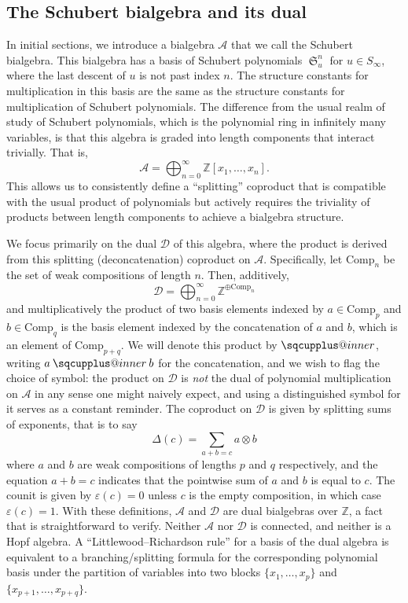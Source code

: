 \documentclass{amsart}
\makeatletter
\newcommand{\sqcupplus@inner}[2]{%
  \vcenter{\hbox{\ooalign{%
    \hfil$\m@th#1\sqcup$\hfil\cr
    \hfil\raisebox{0.15ex}{$\m@th#1\scriptscriptstyle+$}\hfil\cr
  }}}%
}
\newcommand{\sqcupplus}{\mathbin{\mathpalette\sqcupplus@inner\relax}}
\theoremstyle{definition}
\theoremstyle{remark}
\numberwithin{equation}{subsection}
\DeclareMathOperator{\sch}{\mathfrak{S}}
\newcommand{\coma}{\mathcal{A}}
\newcommand{\dcoma}{\mathcal{D}}
\makeatother
\begin{document}
\subsection*{The Schubert bialgebra and its dual} In initial sections, we introduce a bialgebra $\coma$ that we call the Schubert bialgebra. This bialgebra has a basis of Schubert polynomials $\sch_u^n$ for $u\in S_\infty$, where the last descent of $u$ is not past index $n$. The structure constants for multiplication in this basis are the same as the structure constants for multiplication of Schubert polynomials. The difference from the usual realm of study of Schubert polynomials, which is the polynomial ring in infinitely many variables, is that this algebra is graded into length components that interact trivially. That is,
$$\coma = \bigoplus_{n=0}^\infty \mathbb{Z}[x_1,\ldots,x_n]\text{.}$$
This allows us to consistently define a ``splitting'' coproduct that is compatible with the usual product of polynomials but actively requires the triviality of products between length components to achieve a bialgebra structure.

We focus primarily on the dual $\dcoma$ of this algebra, where the product is derived from this splitting (deconcatenation) coproduct on $\coma$. Specifically, let $\mathrm{Comp}_n$ be the set of weak compositions of length $n$. Then, additively,
$$\dcoma = \bigoplus_{n=0}^\infty \mathbb{Z}^{\oplus \mathrm{Comp}_n}$$
and multiplicatively the product of two basis elements indexed by $a\in \mathrm{Comp}_p$ and $b\in \mathrm{Comp}_q$ is the basis element indexed by the concatenation of $a$ and $b$, which is an element of $\mathrm{Comp}_{p+q}$. We will denote this product by $\sqcupplus$, writing $a\sqcupplus b$ for the concatenation, and we wish to flag the choice of symbol: the product on $\dcoma$ is \emph{not} the dual of polynomial multiplication on $\coma$ in any sense one might naively expect, and using a distinguished symbol for it serves as a constant reminder. The coproduct on $\dcoma$ is given by splitting sums of exponents, that is to say
$$\Delta(c) = \sum_{a+b=c} a\otimes b$$
where $a$ and $b$ are weak compositions of lengths $p$ and $q$ respectively, and the equation $a+b=c$ indicates that the pointwise sum of $a$ and $b$ is equal to $c$. The counit is given by $\varepsilon(c)=0$ unless $c$ is the empty composition, in which case $\varepsilon(c)=1$. With these definitions, $\coma$ and $\dcoma$ are dual bialgebras over $\mathbb{Z}$, a fact that is straightforward to verify. Neither $\coma$ nor $\dcoma$ is connected, and neither is a Hopf algebra. A ``Littlewood--Richardson rule'' for a basis of the dual algebra is equivalent to a branching/splitting formula for the corresponding polynomial basis under the partition of variables into two blocks $\{x_1,\ldots,x_p\}$ and $\{x_{p+1},\ldots,x_{p+q}\}$.
\end{document}
